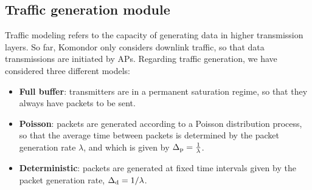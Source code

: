 \documentclass[a4paper]{article}
\begin{document}
%
%

\subsection{Traffic generation module}
\label{section:traffic_modelling}
Traffic modeling refers to the capacity of generating data in higher transmission layers. So far, Komondor only considers downlink traffic, so that data transmissions are initiated by APs. Regarding traffic generation, we have considered three different models:
\begin{itemize}
	\item \textbf{Full buffer}: transmitters are in a permanent saturation regime, so that they always have packets to be sent.
	\item \textbf{Poisson}: packets are generated according to a Poisson distribution process, so that the average time between packets is determined by the packet generation rate $\lambda$, and which is given by $\Delta_{\rm p} = \frac{1}{\lambda}$.
	\item \textbf{Deterministic}: packets are generated at fixed time intervals given by the packet generation rate, $\Delta_{\rm d} = 1/\lambda$.
\end{itemize}
\end{document}
